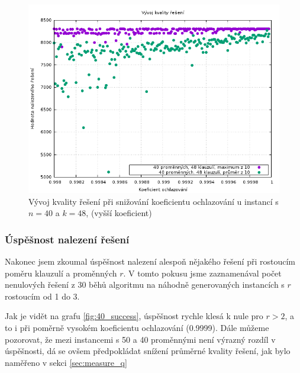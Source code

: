 \documentclass[11pt]{article}
\begin{document}
\begin{figure}[h!]
	\centering
	\includegraphics[width=\textwidth]{../grafy/40_48_cooling2_v.png}
	\caption{Vývoj kvality řešení při snižování koeficientu ochlazování u instancí s $n=40$ a $k=48$, (vyšší koeficient)}
	\label{fig:40_48_cooling2_v}
\end{figure}

\subsubsection{Úspěšnost nalezení řešení}

Nakonec jsem zkoumal úspěšnost nalezení alespoň nějakého řešení při rostoucím poměru klauzulí a proměnných $r$. V tomto pokusu jsme zaznamenával počet nenulových řešení z 30 běhů algoritmu na náhodně generovaných instancích s $r$ rostoucím od 1 do 3.

Jak je vidět na grafu \ref{fig:40_success}, úspěšnost rychle klesá k nule pro $r > 2$, a to i při poměrně vysokém koeficientu ochlazování (0.9999). Dále můžeme pozorovat, že mezi instancemi s 50 a 40 proměnnými není výrazný rozdíl v úspěšnosti, dá se ovšem předpokládat snížení průměrné kvality řešení, jak bylo naměřeno v sekci \ref{sec:measure_q}
\end{document}
